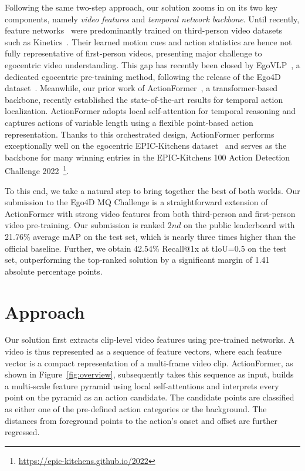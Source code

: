 \documentclass[runningheads]{llncs}
\begin{document}
Following the same two-step approach, our solution zooms in on its two key components, namely \textit{video features} and \textit{temporal network backbone}. Until recently, feature networks~\cite{Feichtenhofer_2019_ICCV,girdhar2022omnivore,arnab2021vivit,fan2021multiscale} were predominantly trained on third-person video datasets such as Kinetics~\cite{kay2017kinetics}. Their learned motion cues and action statistics are hence not fully representative of first-person videos, presenting major challenge to egocentric video understanding. This gap has recently been closed by EgoVLP~\cite{kevin2022egovlp}, a dedicated egocentric pre-training method, following the release of the Ego4D dataset~\cite{Ego4D2022CVPR}. Meanwhile, our prior work of ActionFormer~\cite{zhang2022actionformer}, a transformer-based backbone, recently established the state-of-the-art results for temporal action localization. ActionFormer adopts local self-attention for temporal reasoning and captures actions of variable length using a flexible point-based action representation. Thanks to this orchestrated design, ActionFormer performs exceptionally well on the egocentric EPIC-Kitchens dataset~\cite{Damen2022RESCALING} and serves as the backbone for many winning entries in the EPIC-Kitchens 100 Action Detection Challenge 2022~\footnote{\url{https://epic-kitchens.github.io/2022}}. 

To this end, we take a natural step to bring together the best of both worlds. Our submission to the Ego4D MQ Challenge is a straightforward extension of ActionFormer with strong video features from both third-person and first-person video pre-training. Our submission is ranked 2$nd$ on the public leaderboard with 21.76\% average mAP on the test set, which is nearly three times higher than the official baseline. Further, we obtain 42.54\% Recall@1x at tIoU=0.5 on the test set, outperforming the top-ranked solution by a significant margin of 1.41 absolute percentage points.

\section{Approach}

Our solution first extracts clip-level video features using pre-trained networks. A video is thus represented as a sequence of feature vectors, where each feature vector is a compact representation of a multi-frame video clip. ActionFormer, as shown in Figure~\ref{fig:overview}, subsequently takes this sequence as input, builds a multi-scale feature pyramid using local self-attentions and interprets every point on the pyramid as an action candidate. The candidate points are classified as either one of the pre-defined action categories or the background. The distances from foreground points to the action's onset and offset are further regressed.\smallskip
\end{document}
